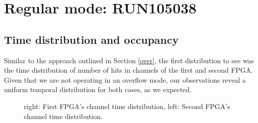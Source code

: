 

\section{Regular mode: RUN105038}
\subsection{Time distribution and occupancy}
Similar to the approach outlined in Section \ref{over}, the first distribution to see was the time distribution of number of hits in channels of the first and second FPGA. Given that we are not operating in an overflow mode, our observations reveal a uniform temporal distribution for both cases, as we expected.
\begin{figure}[H]
  \hspace{-0.5in}
  \caption{
    \label{fig:4}
    right: First FPGA's channel time distribution, left: Second FPGA's channel time distribution.
  }
\end{figure}
